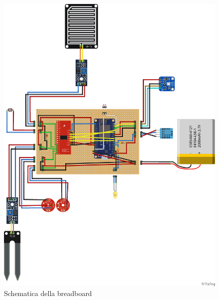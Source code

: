 \documentclass[a4paper, 12pt]{report}
\begin{document}
\begin{figure}[htbp]
\centering
\includegraphics[scale=0.3]{hardware/iot_project_bb.png}
\caption{Schematica della breadboard}
\label{fig:breadboard}
\end{figure}
\end{document}
